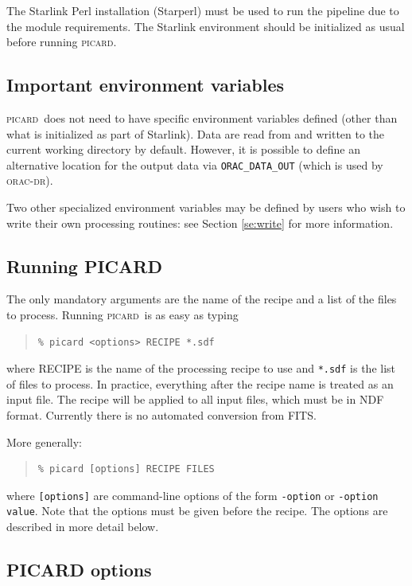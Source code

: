 \documentclass[twoside,11pt]{article}
\renewcommand{\_}{\texttt{\symbol{95}}}
\newenvironment{myquote}{\begin{quote}\begin{small}}{\end{small}\end{quote}}
\newcommand{\oracdr}{\textsc{orac-dr}}
\newcommand{\picard}{\textsc{picard}}
\newcommand{\task}[1]{\textsf{#1}}
\begin{document}
The Starlink Perl installation (Starperl) must be used to run the
pipeline due to the module requirements. The Starlink environment
should be initialized as usual before running \picard.

\subsection{Important environment variables}

\picard\ does not need to have specific environment variables defined
(other than what is initialized as part of Starlink). Data are read
from and written to the current working directory by default. However,
it is possible to define an alternative location for the output data
via \verb+ORAC_DATA_OUT+ (which is used by \oracdr).

Two other specialized environment variables may be defined by users
who wish to write their own processing routines: see Section
\ref{se:write} for more information.

\subsection{Running PICARD}

The only mandatory arguments are the name of the recipe and a list of
the files to process. Running \picard\ is as easy as typing
\begin{myquote}
\begin{verbatim}
% picard <options> RECIPE *.sdf
\end{verbatim}
\end{myquote}
where \task{RECIPE} is the name of the processing recipe to use and
\verb+*.sdf+ is the list of files to process. In practice, everything
after the recipe name is treated as an input file. The recipe will be
applied to all input files, which must be in NDF format. Currently
there is no automated conversion from FITS.

More generally:
\begin{myquote}
\begin{verbatim}
% picard [options] RECIPE FILES
\end{verbatim}
\end{myquote}
where \verb+[options]+ are command-line options of the form
\verb+-option+ or \verb+-option value+.  Note that the options must be
given before the recipe. The options are described in more detail
below.

\subsection{PICARD options}
\end{document}
